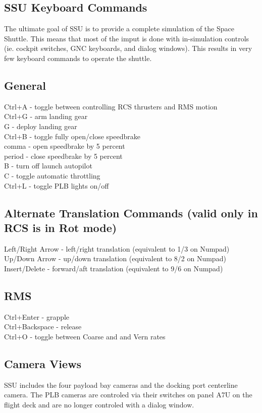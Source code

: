 \documentclass[13pt, letter,final]{article}
\begin{document}
\subsection*{\large SSU Keyboard Commands}
The ultimate goal of SSU is to provide a complete simulation of the Space Shuttle.  This means that most of the imput is done with in-simulation controls (ie. cockpit switches, GNC keyboards, and dialog windows). This results in very few keyboard commands to operate the shuttle.

\subsection*{General}
Ctrl+A - toggle between controlling RCS thrusters and RMS motion\\
Ctrl+G - arm landing gear\\
G - deploy landing gear\\
Ctrl+B - toggle fully open/close speedbrake\\
comma - open speedbrake by 5 percent\\
period - close speedbrake by 5 percent\\
B - turn off launch autopilot\\
C - toggle automatic throttling\\
Ctrl+L - toggle PLB lights on/off

\subsection*{Alternate Translation Commands (valid only in RCS is in Rot mode)}
Left/Right Arrow - left/right translation (equivalent to 1/3 on Numpad)\\
Up/Down Arrow - up/down translation (equivalent to 8/2 on Numpad)\\
Insert/Delete - forward/aft translation (equivalent to 9/6 on Numpad)\\

\subsection*{RMS}
Ctrl+Enter - grapple\\
Ctrl+Backspace - release\\
Ctrl+O - toggle between Coarse and and Vern rates\\
\newpage

\subsection*{\large Camera Views}
SSU includes the four payload bay cameras and the docking port centerline camera. The PLB cameras are controled via their switches on panel A7U on the flight deck and are no longer controled with a dialog window.
\end{document}
